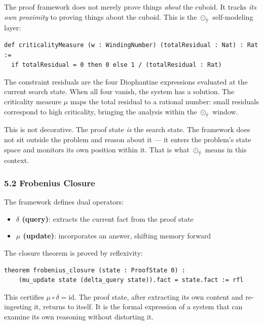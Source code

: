 The proof framework does not merely prove things \emph{about} the
cuboid. It tracks \emph{its own proximity} to proving things about the
cuboid. This is the \(\odot_{\text{ÿ}}\) self-modeling layer:

\begin{verbatim}
def criticalityMeasure (w : WindingNumber) (totalResidual : Nat) : Rat :=
  if totalResidual = 0 then 0 else 1 / (totalResidual : Rat)
\end{verbatim}

The constraint residuals are the four Diophantine expressions evaluated
at the current search state. When all four vanish, the system has a
solution. The criticality measure \(\mu\) maps the total residual to a
rational number: small residuals correspond to high criticality,
bringing the analysis within the \(\odot_{\text{ÿ}}\) window.

This is not decorative. The proof state \emph{is} the search state. The
framework does not sit outside the problem and reason about it --- it
enters the problem's state space and monitors its own position within
it. That is what \(\odot_{\text{ÿ}}\) means in this context.

\subsubsection{5.2 Frobenius Closure}\label{frobenius-closure}

The framework defines dual operators:

\begin{itemize}
\tightlist
\item
  \textbf{\(\delta\) (query)}: extracts the current fact from the proof
  state
\item
  \textbf{\(\mu\) (update)}: incorporates an answer, shifting memory
  forward
\end{itemize}

The closure theorem is proved by reflexivity:

\begin{verbatim}
theorem frobenius_closure (state : ProofState 0) :
    (mu_update state (delta_query state)).fact = state.fact := rfl
\end{verbatim}

This certifies \(\mu \circ \delta = \text{id}\). The proof state, after
extracting its own content and re-ingesting it, returns to itself. It is
the formal expression of a system that can examine its own reasoning
without distorting it.

